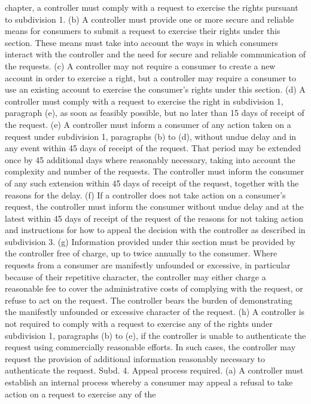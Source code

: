 chapter, a controller must comply with a request to exercise the rights pursuant to subdivision
1.
(b) A controller must provide one or more secure and reliable means for consumers to
submit a request to exercise their rights under this section. These means must take into
account the ways in which consumers interact with the controller and the need for secure
and reliable communication of the requests.
(c) A controller may not require a consumer to create a new account in order to exercise
a right, but a controller may require a consumer to use an existing account to exercise the
consumer's rights under this section.
(d) A controller must comply with a request to exercise the right in subdivision 1,
paragraph (e), as soon as feasibly possible, but no later than 15 days of receipt of the request.
(e) A controller must inform a consumer of any action taken on a request under
subdivision 1, paragraphs (b) to (d), without undue delay and in any event within 45 days
of receipt of the request. That period may be extended once by 45 additional days where
reasonably necessary, taking into account the complexity and number of the requests. The
controller must inform the consumer of any such extension within 45 days of receipt of the
request, together with the reasons for the delay.
(f) If a controller does not take action on a consumer's request, the controller must inform
the consumer without undue delay and at the latest within 45 days of receipt of the request
of the reasons for not taking action and instructions for how to appeal the decision with the
controller as described in subdivision 3.
(g) Information provided under this section must be provided by the controller free of
charge, up to twice annually to the consumer. Where requests from a consumer are manifestly
unfounded or excessive, in particular because of their repetitive character, the controller
may either charge a reasonable fee to cover the administrative costs of complying with the
request, or refuse to act on the request. The controller bears the burden of demonstrating
the manifestly unfounded or excessive character of the request.
(h) A controller is not required to comply with a request to exercise any of the rights
under subdivision 1, paragraphs (b) to (e), if the controller is unable to authenticate the
request using commercially reasonable efforts. In such cases, the controller may request
the provision of additional information reasonably necessary to authenticate the request.
Subd. 4. Appeal process required. (a) A controller must establish an internal process
whereby a consumer may appeal a refusal to take action on a request to exercise any of the
